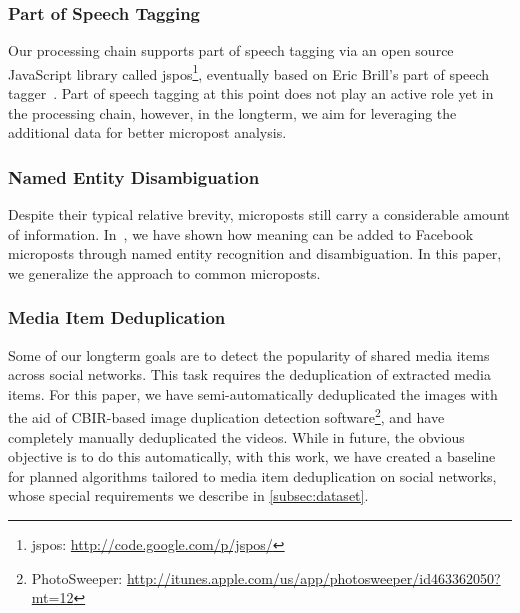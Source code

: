 \documentclass{acm_proc_article-sp}
\newcommand{\inlinelistingsize}{\fontsize{8pt}{11pt}}
\let\oldurl\url
\renewcommand{\url}[1]{\inlinelistingsize\oldurl{#1}}
\begin{document}
\subsubsection{Part of Speech Tagging}
Our processing chain supports part of speech tagging via an open source JavaScript library called jspos\footnote{jspos: \url{http://code.google.com/p/jspos/}},
eventually based on Eric Brill's part of speech tagger~\cite{brill1992simple}.
Part of speech tagging at this point does not play an active role yet in the processing chain, however,
in the longterm, we aim for leveraging the additional data for better micropost analysis.

\subsubsection{Named Entity Disambiguation}
Despite their typical relative brevity, microposts still carry a considerable amount of information.
In~\cite{AddingMeaningToMicroposts}, we have shown how meaning can be added to Facebook microposts through named entity recognition and disambiguation.
In this paper, we generalize the approach to common microposts.

\subsubsection{Media Item Deduplication} \label{sec:deduplication}
Some of our longterm goals are to detect the popularity of shared media items across social networks.
This task requires the deduplication of extracted media items.
For this paper, we have semi-automatically deduplicated the images with the aid of CBIR-based image duplication detection software\footnote{PhotoSweeper: \url{http://itunes.apple.com/us/app/photosweeper/id463362050?mt=12}}, and have completely manually deduplicated the videos.
While in future, the obvious objective is to do this automatically, with this work,
we have created a baseline for planned algorithms tailored to media item deduplication on social networks,
whose special requirements we describe in \autoref{subsec:dataset}.
\end{document}
